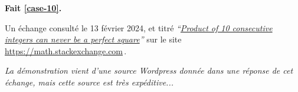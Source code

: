 \smallskip
\noindent





\bigskip
\textbf{Fait \ref{case-10}.}
	
\smallskip
\noindent
Un échange consulté le 13 février 2024, et titré
\emph{\enquote{\href{https://math.stackexchange.com/q/2361670/52365}{Product of 10 consecutive integers can never be a perfect square}}} 
sur le site \url{https://math.stackexchange.com}\,.

\smallskip
\noindent
\emph{La démonstration vient d'une source Wordpress donnée dans une réponse de cet échange, mais cette source est très expéditive...}

